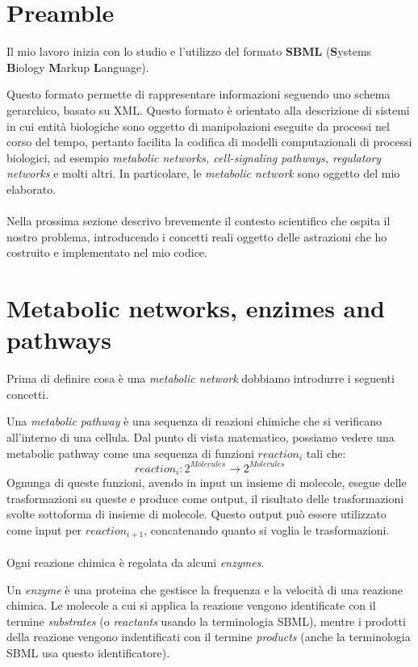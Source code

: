 
\section{Preamble}
Il mio lavoro inizia con lo studio e l'utilizzo del formato
\textbf{SBML} (\textbf{S}ystems \textbf{B}iology \textbf{M}arkup 
\textbf{L}anguage). 

Questo formato permette di rappresentare informazioni seguendo uno
schema gerarchico, basato su XML. Questo formato \`e orientato alla
descrizione di sistemi in cui entit\`a biologiche sono oggetto di
manipolazioni eseguite da processi nel corso del tempo, pertanto
facilita la codifica di modelli computazionali di processi biologici,
ad esempio \emph{metabolic networks, cell-signaling pathways,
  regulatory networks} e molti altri. In particolare, le
\emph{metabolic network} sono oggetto del mio elaborato.
\\\\
Nella prossima sezione descrivo brevemente il contesto scientifico che
ospita il nostro problema, introducendo i concetti reali oggetto delle
astrazioni che ho costruito e implementato nel mio codice.

\section{Metabolic networks, enzimes and pathways}

Prima di definire cosa \`e una \emph{metabolic network} dobbiamo
introdurre i seguenti concetti.

Una \emph{metabolic pathway} \`e una sequenza di reazioni chimiche che
si verificano all'interno di una cellula. Dal punto di vista
matematico, possiamo vedere una metabolic pathway come una sequenza di
funzioni $reaction_{i}$ tali che:
\begin{displaymath}
reaction_{i} : 2^{Molecules} \rightarrow 2^{Molecules}
\end{displaymath}
Ognunga di queste funzioni, avendo in input un insieme di molecole,
esegue delle trasformazioni su queste e produce come output, il
risultato delle trasformazioni svolte sottoforma di insieme di
molecole. Questo output pu\`o essere utilizzato come input per
$reaction_{i+1}$, concatenando quanto si voglia le trasformazioni.
\\\\
Ogni reazione chimica \`e regolata da alcuni \emph{enzymes}.

Un \emph{enzyme} \`e una proteina che gestisce la frequenza e la
velocit\`a di una reazione chimica. Le molecole a cui si applica la
reazione vengono identificate con il termine \emph{substrates} (o
\emph{reactants} usando la terminologia SBML), mentre i prodotti della
reazione vengono indentificati con il termine \emph{products} (anche la
terminologia SBML usa questo identificatore).

